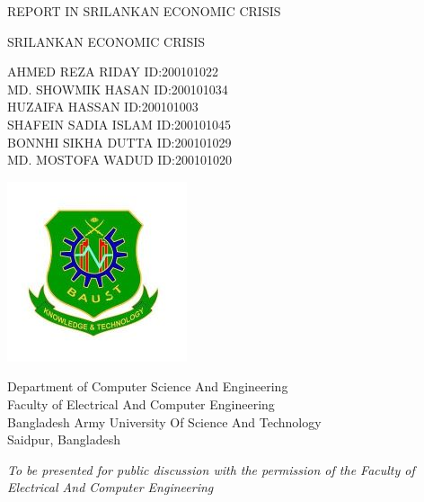 \documentclass[a4paper,12pt]{article}
\begin{document}
\pagestyle{empty}

\begin{center}
REPORT IN SRILANKAN ECONOMIC CRISIS \\

\vspace*{.5cm}

{\Large SRILANKAN ECONOMIC CRISIS
\\
}

\vspace*{2cm}

{\large
AHMED REZA RIDAY    \hspace{3.4cm}  ID:200101022\\
MD. SHOWMIK HASAN    \hspace{3.1cm}    ID:200101034\\
HUZAIFA HASSAN    \hspace{4.3cm}     ID:200101003\\
SHAFEIN SADIA ISLAM    \hspace{3cm}   ID:200101045\\
BONNHI SIKHA DUTTA    \hspace{3cm}   ID:200101029\\
MD. MOSTOFA WADUD    \hspace{3cm}   ID:200101020\\
}
\vspace*{1cm}
\graphicspath{ {./images/} }
\includegraphics{baust 1}

Department of Computer Science And Engineering \\
Faculty of Electrical And Computer Engineering \\
Bangladesh Army University Of Science And Technology \\
Saidpur, Bangladesh

\vspace*{.5cm}

{\em To be presented for public discussion with the permission of the Faculty of Electrical And Computer Engineering
}


\end{center}
\end{document}
